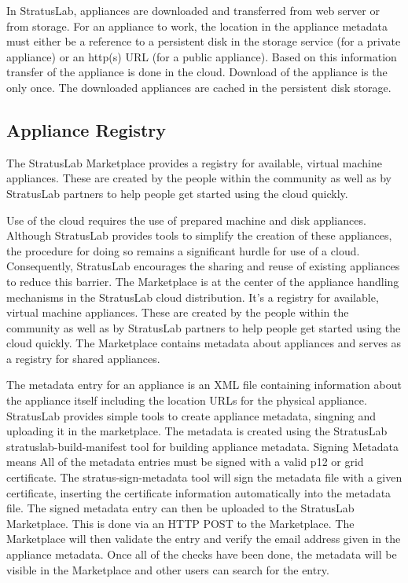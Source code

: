 In StratusLab, appliances are downloaded and transferred from web server or from storage. For  an appliance to work, the location in the appliance metadata must either be a reference to a persistent disk in the storage service (for a private appliance) or an http(s) URL (for a public appliance). Based on this information transfer of the appliance is done in the cloud. 
Download of the appliance is the only once. The downloaded appliances are cached in the persistent disk storage. 
\subsection{Appliance Registry}
The StratusLab Marketplace provides a registry for available, virtual machine appliances. These are created by the people within the community as well as by StratusLab partners to help people get started using the cloud quickly.

Use of the cloud requires the use of
prepared machine and disk appliances. Although StratusLab provides tools to simplify the creation of these appliances, the procedure for doing so remains a significant
hurdle for use of a cloud. Consequently, StratusLab encourages the sharing and
reuse of existing appliances to reduce this barrier.
The Marketplace is at the center of the appliance handling mechanisms in the StratusLab cloud distribution. It's a registry for available, virtual machine appliances. These are created by the people within the community as well as by StratusLab partners to help people get started using the cloud quickly. 
The Marketplace contains metadata about appliances and serves as a registry for shared appliances. 

The metadata entry for an appliance is an XML file containing information about the appliance itself including the location URLs for the physical appliance. StratusLab provides simple tools to create appliance metadata, singning and uploading it in the marketplace.
The metadata is created using the StratusLab stratuslab-build-manifest tool for building appliance metadata.
Signing  Metadata means All of the metadata entries must be signed with a valid p12 or grid certificate. The stratus-sign-metadata tool will sign the metadata file with a given certificate, inserting the certificate information automatically into the metadata file.
The signed metadata entry can then be uploaded to the StratusLab Marketplace. This is done via an HTTP POST to  the Marketplace.
The Marketplace will then validate the entry and verify the email address given in the appliance metadata. Once all of the checks have been done, the metadata will be visible in the Marketplace and other users can search for the entry.

